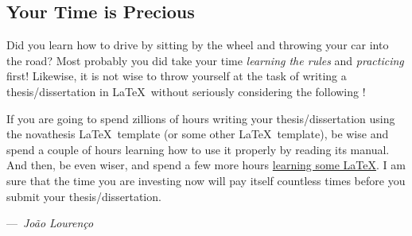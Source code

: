 %
%
%
%
    
\subsection{Your Time is Precious}
\label{sub:time_is_money}

Did you learn how to drive by sitting by the wheel and throwing your car into the road?  Most probably you did take your time \emph{learning the rules} and \emph{practicing} first! Likewise, it is not wise to throw yourself at the task of writing a thesis/dissertation in \LaTeX\ without seriously considering the following !

\begin{tcolorbox}[colback=green!8]
  If you are going to spend zillions of hours writing your thesis/dissertation using the \gls{novathesis} \LaTeX\ template (or some other \LaTeX\ template), be wise and spend a couple of hours learning how to use it properly by reading its manual.  And then, be even wiser, and spend a few more hours \href{https://github.com/joaomlourenco/novathesis/wiki\#learning-latex}{learning some \LaTeX}.  I am sure that the time you are investing now will pay itself countless times before you submit your thesis/dissertation.\\\parbox{\linewidth}{\raggedleft---~\emph{João Lourenço}}
\end{tcolorbox}

